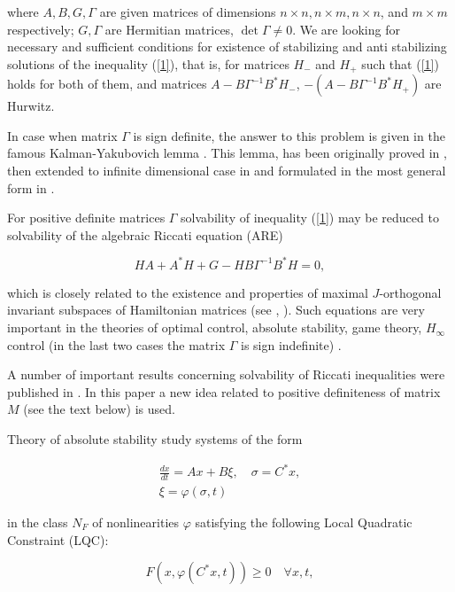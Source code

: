 \documentclass[11pt, reqno]{amsart}
\theoremstyle{plain}
\begin{document}
\noindent where $A, B, G, \Gamma $ are given matrices of dimensions $n\times n, n\times m,
n\times n$, and $m\times m$ respectively; $G, \Gamma $ are Hermitian matrices, $\det \Gamma
\neq 0$. We are looking for necessary and sufficient conditions for existence of stabilizing and anti stabilizing solutions of the inequality (\ref{1}), that is, for matrices $H_{-}$ and $H_{+}$ such that (\ref{1}) holds for both of them, and matrices $A-B\Gamma^{-1}B^{*}H_{-}$, $-(A-B\Gamma^{-1}B^{*}H_{+})$ are Hurwitz.

In case when matrix $\Gamma$ is sign definite, the answer to this problem is given in the famous Kalman-Yakubovich lemma \cite{frequencydomain}. This lemma, has been originally proved in \cite{ineq}, then extended to infinite dimensional case in \cite{control_theory} and formulated in the most general form in \cite{solvability}.

For positive definite matrices $\Gamma$ solvability of inequality (\ref{1}) may be reduced to solvability of the algebraic Riccati equation (ARE)

$$ HA + A^{*}H + G - HB\Gamma ^{-1}B^{*}H = 0,$$

\noindent which is closely related to the existence and properties of maximal $J$-orthogonal invariant subspaces of Hamiltonian matrices (see \cite{ricci}, \cite{Hamiltonianmatrices}). Such equations are very important in the theories of optimal control, absolute stability, game theory, $H_{\infty}$ control (in the last two cases the matrix $\Gamma$ is sign indefinite) \cite{Scherer}. 

A number of important results concerning solvability of Riccati inequalities were published in \cite{Riccatiinequalities}. In this paper a new idea related to positive definiteness of matrix $M$ (see the text below) is used.

Theory of absolute stability study systems of the form 

\begin{equation}\label{abs} 
\begin{array}{c}
\frac{dx}{dt} = Ax + B\xi,\quad \sigma=C^{*}x, \\
 \xi = \varphi(\sigma,t)
\end{array}
\end{equation}

\noindent in the class $N_{F}$ of nonlinearities $\varphi$ satisfying the following Local Quadratic Constraint (LQC):

\begin{equation}\label{LQC} 
F(x,\varphi(C^{*}x,t))\ge 0 \quad \forall x,t,
\end{equation}
\end{document}
